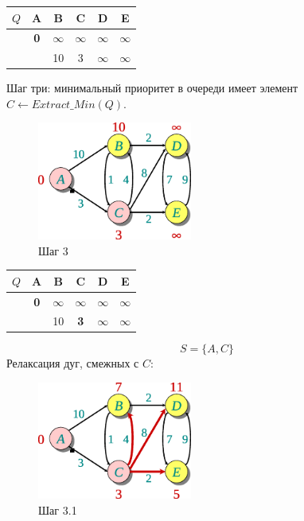 \documentclass[11pt]{article}
\begin{document}
\begin{center}
\begin{tabular}{|r|c|c|c|c|c|}
  \hline
     $Q$ & A & \textbf{B} & \textbf{C} & \textbf{D} & \textbf{E} \\
  \hline
         & \textbf{0} & $\infty$ & $\infty$ & $\infty$ & $\infty$ \\
  \hline
         & & 10 & 3 & $\infty$ & $\infty$ \\
  \hline
\end{tabular}
\end{center}
\newpage
Шаг три: минимальный приоритет в очереди имеет элемент $C \leftarrow Extract\_Min(Q)$.
\begin{figure}[h!]
  \centering
  \includegraphics[width=2in]{lecture17/dijkstra3.eps}
  \caption{Шаг 3}
\end{figure}
\begin{center}
\begin{tabular}{|r|c|c|c|c|c|}
  \hline
     $Q$ & A & \textbf{B} & C & \textbf{D} & \textbf{E} \\
  \hline
         & \textbf{0} & $\infty$ & $\infty$ & $\infty$ & $\infty$ \\
  \hline
         & & 10 & \textbf{3} & $\infty$ & $\infty$ \\
  \hline
\end{tabular}
\end{center}
\begin{equation*}
  S = \{A, C\}
\end{equation*}
Релаксация дуг, смежных с $C$:
\begin{figure}[h!]
  \centering
  \includegraphics[width=2in]{lecture17/dijkstra31.eps}
  \caption{Шаг 3.1}
\end{figure}
\end{document}
